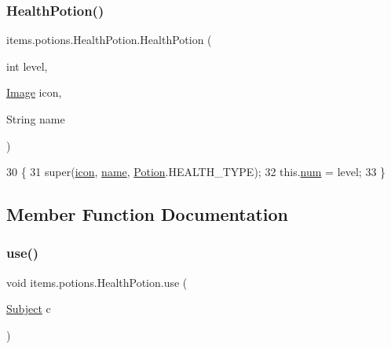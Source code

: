 \subsubsection{\texorpdfstring{Health\+Potion()}{HealthPotion()}\hspace{0.1cm}{\footnotesize\ttfamily [2/2]}}
{\footnotesize\ttfamily items.\+potions.\+Health\+Potion.\+Health\+Potion (\begin{DoxyParamCaption}\item[{int}]{level,  }\item[{\mbox{\hyperlink{classorg_1_1newdawn_1_1slick_1_1_image}{Image}}}]{icon,  }\item[{String}]{name }\end{DoxyParamCaption})\hspace{0.3cm}{\ttfamily [inline]}}


\begin{DoxyCode}
30                                                             \{
31         super(\mbox{\hyperlink{classitems_1_1_item_afa445ad011d48c3455b0c04bec2581f9}{icon}}, \mbox{\hyperlink{classitems_1_1_item_a086327df1ba046bbbe3fa2f753226d73}{name}}, \mbox{\hyperlink{classitems_1_1_potion_ab2a46630762ff8d852c72333029252e5}{Potion}}.HEALTH\_TYPE);
32         this.\mbox{\hyperlink{classitems_1_1potions_1_1_health_potion_a0d748e2dc730a38bab9f68ef71003a03}{num}} = level;
33     \}
\end{DoxyCode}


\subsection{Member Function Documentation}
\mbox{\label{classitems_1_1potions_1_1_health_potion_af43faa8c41c3ce2dd49f3a5e992468ba}} 
\subsubsection{\texorpdfstring{use()}{use()}}
{\footnotesize\ttfamily void items.\+potions.\+Health\+Potion.\+use (\begin{DoxyParamCaption}\item[{\mbox{\hyperlink{classentities_1_1_subject}{Subject}}}]{c }\end{DoxyParamCaption})\hspace{0.3cm}{\ttfamily [inline]}}


